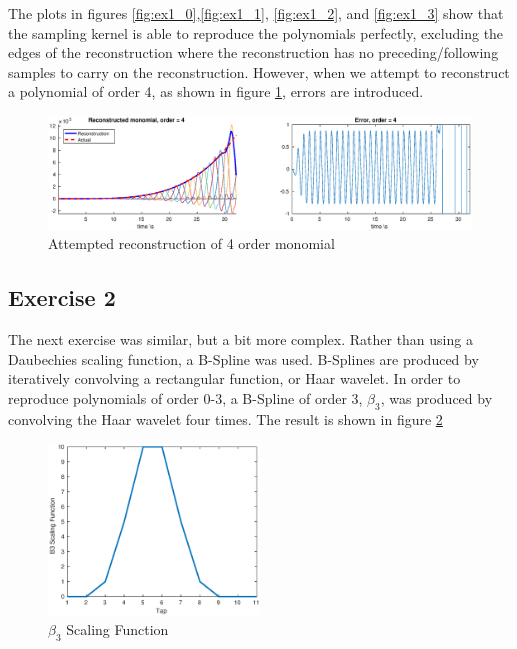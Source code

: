 \documentclass[a4paper]{article}
\begin{document}
The plots in figures \ref{fig:ex1_0},\ref{fig:ex1_1}, \ref{fig:ex1_2}, and \ref{fig:ex1_3} show that the sampling kernel is able to reproduce the polynomials perfectly, excluding the edges of the reconstruction where the reconstruction has no preceding/following samples to carry on the reconstruction. However, when we attempt to reconstruct a polynomial of order 4, as shown in figure \ref{fig:ex1_4}, errors are introduced. 

\begin{figure}[H]
    \centering
    \includegraphics[width=1\textwidth]{../images/ex1_4}
    \caption{Attempted reconstruction of 4 order monomial}
    \label{fig:ex1_4}
\end{figure}


\subsection{Exercise 2}

The next exercise was similar, but a bit more complex. Rather than using a Daubechies scaling function, a B-Spline was used. B-Splines are produced by iteratively convolving a rectangular function, or Haar wavelet. In order to reproduce polynomials of order 0-3, a B-Spline of order 3, $\beta_3$, was produced by convolving the Haar wavelet four times. The result is shown in figure \ref{fig:ex2_1}

\begin{figure}[H]
    \centering
    \includegraphics[width=0.5\textwidth]{../images/ex2}
    \caption{$\beta_3$ Scaling Function}
    \label{fig:ex2_1}
\end{figure}
\end{document}
